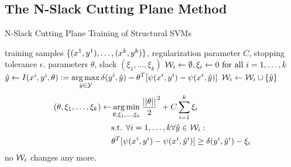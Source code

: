 

\subsection{The N-Slack Cutting Plane Method}
\begin{algorithm*}[t]
    \caption{N-Slack Cutting Plane Training of Structural SVMs \label{alg_n_slack}}
    \begin{doublespacing}
    \begin{algorithmic}[1]
        \Require training samples $\{ (x^{1}, y^{1}), \dots, (x^{k}, y^{k})\}$, regularization parameter $C$, stopping tolerance $\epsilon$.
        \Ensure parameters $\theta$, slack $(\xi_1, \dotsc, \xi_k)$
        \State $\mathcal{W}_i \leftarrow \emptyset, \xi_i \leftarrow 0 \text{ for all } i=1,\dots,k$
        \Repeat
                \State
                $\hat{y} \leftarrow I(x^{i}, y^{i}, \theta) := \displaystyle \operatorname*{arg\,max}_{\hat{y}\in\mathcal{Y}} \delta(y^{i}, \hat{y}) - \theta^T [\psi(x^{i}, y^{i}) - \psi(x^{i}, \hat{y})] $
                    \State $\mathcal{W}_i \leftarrow \mathcal{W}_i \cup \{ \hat{y}\} $
                    \State
                    \vspace{-15mm}
                    \begin{align*}
                    (\theta, \xi_1, \dots, \xi_k) \leftarrow \displaystyle &\operatorname*{arg\,min}_{\theta, \xi_1, \dots, \xi_k} \frac{||\theta||}{2}^2 + C \sum_{i=1}^k\xi_i\\
                    &\text{s.t. }\forall i=1,\dots,k \forall \hat{y} \in \mathcal{W}_i:\\
                    &\theta^T [\psi(x^{i}, y^{i}) - \psi(x^{i}, \hat{y}^{i})] \geq \delta(y^{i}, \hat{y}^{i}) - \xi_i
                    \end{align*}
                \EndIf
            \EndFor
            \vspace{-10mm}
            \Until no $\mathcal{W}_i$ changes any more.
        \end{algorithmic}
    \end{doublespacing}
    \end{algorithm*}


